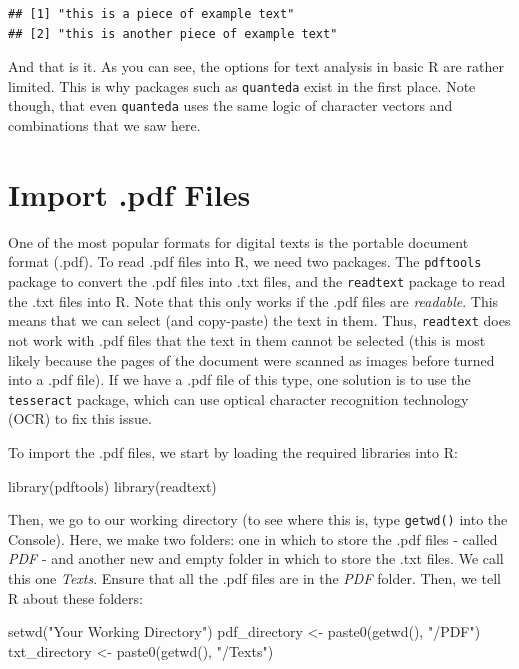 \documentclass[
]{book}
\newenvironment{Shaded}{\begin{snugshade}}{\end{snugshade}}
\newcommand{\FunctionTok}[1]{\textcolor[rgb]{0.00,0.00,0.00}{#1}}
\newcommand{\NormalTok}[1]{#1}
\newcommand{\OtherTok}[1]{\textcolor[rgb]{0.56,0.35,0.01}{#1}}
\newcommand{\StringTok}[1]{\textcolor[rgb]{0.31,0.60,0.02}{#1}}
\begin{document}
\begin{verbatim}
## [1] "this is a piece of example text"      
## [2] "this is another piece of example text"
\end{verbatim}

And that is it. As you can see, the options for text analysis in basic R are rather limited. This is why packages such as \texttt{quanteda} exist in the first place. Note though, that even \texttt{quanteda} uses the same logic of character vectors and combinations that we saw here.

\hypertarget{import-.pdf-files}{%
\section{Import .pdf Files}\label{import-.pdf-files}}

One of the most popular formats for digital texts is the portable document format (.pdf). To read .pdf files into R, we need two packages. The \texttt{pdftools} package to convert the .pdf files into .txt files, and the \texttt{readtext} package to read the .txt files into R. Note that this only works if the .pdf files are \emph{readable}. This means that we can select (and copy-paste) the text in them. Thus, \texttt{readtext} does not work with .pdf files that the text in them cannot be selected (this is most likely because the pages of the document were scanned as images before turned into a .pdf file). If we have a .pdf file of this type, one solution is to use the \texttt{tesseract} package, which can use optical character recognition technology (OCR) to fix this issue.

To import the .pdf files, we start by loading the required libraries into R:

\begin{Shaded}
\begin{Highlighting}[]
\FunctionTok{library}\NormalTok{(pdftools)}
\FunctionTok{library}\NormalTok{(readtext)}
\end{Highlighting}
\end{Shaded}

Then, we go to our working directory (to see where this is, type \texttt{getwd()} into the Console). Here, we make two folders: one in which to store the .pdf files - called \emph{PDF} - and another new and empty folder in which to store the .txt files. We call this one \emph{Texts}. Ensure that all the .pdf files are in the \emph{PDF} folder. Then, we tell R about these folders:

\begin{Shaded}
\begin{Highlighting}[]
\FunctionTok{setwd}\NormalTok{(}\StringTok{"Your Working Directory"}\NormalTok{)}
\NormalTok{pdf\_directory }\OtherTok{\textless{}{-}} \FunctionTok{paste0}\NormalTok{(}\FunctionTok{getwd}\NormalTok{(), }\StringTok{"/PDF"}\NormalTok{)}
\NormalTok{txt\_directory }\OtherTok{\textless{}{-}} \FunctionTok{paste0}\NormalTok{(}\FunctionTok{getwd}\NormalTok{(), }\StringTok{"/Texts"}\NormalTok{)}
\end{Highlighting}
\end{Shaded}
\end{document}
